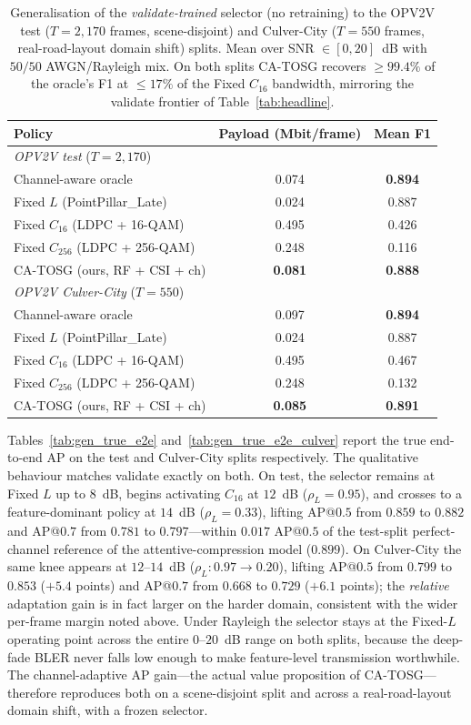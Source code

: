 \documentclass[journal]{IEEEtran}
\newcommand{\method}{CA-TOSG}
\begin{document}
\begin{table}[t]
\centering
\caption{Generalisation of the \emph{validate-trained} selector (no retraining) to the OPV2V test ($T=2{,}170$ frames, scene-disjoint) and Culver-City ($T=550$ frames, real-road-layout domain shift) splits. Mean over SNR $\in[0,20]$~dB with $50/50$ AWGN/Rayleigh mix. On both splits \method{} recovers $\ge 99.4\%$ of the oracle's F1 at $\le 17\%$ of the Fixed $C_{16}$ bandwidth, mirroring the validate frontier of Table~\ref{tab:headline}.}
\label{tab:gen_headline}
\begin{tabular}{lcc}
\toprule
Policy & Payload (Mbit/frame) & Mean F1 \\
\midrule
\multicolumn{3}{l}{\emph{OPV2V test} ($T=2{,}170$)} \\
Channel-aware oracle           & 0.074 & \textbf{0.894} \\
Fixed $L$ (PointPillar\_Late)   & 0.024 & 0.887 \\
Fixed $C_{16}$ (LDPC + 16-QAM)  & 0.495 & 0.426 \\
Fixed $C_{256}$ (LDPC + 256-QAM)& 0.248 & 0.116 \\
\method{} (ours, RF + CSI + ch) & \textbf{0.081} & \textbf{0.888} \\
\midrule
\multicolumn{3}{l}{\emph{OPV2V Culver-City} ($T=550$)} \\
Channel-aware oracle           & 0.097 & \textbf{0.894} \\
Fixed $L$ (PointPillar\_Late)   & 0.024 & 0.887 \\
Fixed $C_{16}$ (LDPC + 16-QAM)  & 0.495 & 0.467 \\
Fixed $C_{256}$ (LDPC + 256-QAM)& 0.248 & 0.132 \\
\method{} (ours, RF + CSI + ch) & \textbf{0.085} & \textbf{0.891} \\
\bottomrule
\end{tabular}
\end{table}

Tables~\ref{tab:gen_true_e2e} and~\ref{tab:gen_true_e2e_culver} report the true end-to-end AP on the test and Culver-City splits respectively. The qualitative behaviour matches validate exactly on both. On test, the selector remains at Fixed $L$ up to $8$~dB, begins activating $C_{16}$ at $12$~dB ($\rho_L=0.95$), and crosses to a feature-dominant policy at $14$~dB ($\rho_L=0.33$), lifting AP@$0.5$ from $0.859$ to $0.882$ and AP@$0.7$ from $0.781$ to $0.797$---within $0.017$ AP@$0.5$ of the test-split perfect-channel reference of the attentive-compression model ($0.899$). On Culver-City the same knee appears at $12$--$14$~dB ($\rho_L: 0.97 \to 0.20$), lifting AP@$0.5$ from $0.799$ to $0.853$ ($+5.4$ points) and AP@$0.7$ from $0.668$ to $0.729$ ($+6.1$ points); the \emph{relative} adaptation gain is in fact larger on the harder domain, consistent with the wider per-frame margin noted above. Under Rayleigh the selector stays at the Fixed-$L$ operating point across the entire $0$--$20$~dB range on both splits, because the deep-fade BLER never falls low enough to make feature-level transmission worthwhile. The channel-adaptive AP gain---the actual value proposition of \method{}---therefore reproduces both on a scene-disjoint split and across a real-road-layout domain shift, with a frozen selector.
\end{document}

